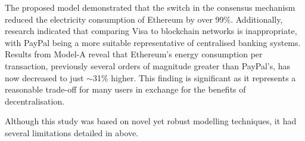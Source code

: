 The proposed model demonstrated that the switch in the consensus mechanism reduced the electricity consumption of Ethereum by over 99\%. Additionally, research indicated that comparing Visa to blockchain networks is inappropriate, with PayPal being a more suitable representative of centralised banking systems. Results from Model-A reveal that Ethereum's energy consumption per transaction, previously several orders of magnitude greater than PayPal's, has now decreased to just $\sim$31\% higher. This finding is significant as it represents a reasonable trade-off for many users in exchange for the benefits of decentralisation.  

Although this study was based on novel yet robust modelling techniques, it had several limitations detailed in  above.